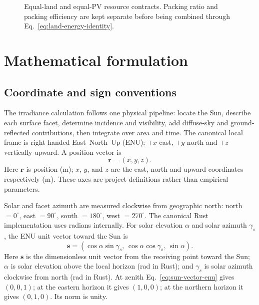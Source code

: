 \documentclass[11pt,a4paper]{article}
\begin{document}
\begin{figure}[htbp]\centering

\caption{Equal-land and equal-PV resource contracts. Packing ratio and packing efficiency are kept separate before being combined through Eq.~\eqref{eq:land-energy-identity}.}
\label{fig:fair-comparison-framework}\end{figure}

\section{Mathematical formulation}
\subsection{Coordinate and sign conventions}
The irradiance calculation follows one physical pipeline: locate the Sun, describe each surface facet, determine incidence and visibility, add diffuse-sky and ground-reflected contributions, then integrate over area and time.
The canonical local frame is right-handed East--North--Up (ENU): \(+x\) east, \(+y\) north and \(+z\) vertically upward. A position vector is
\begin{equation}
\mathbf r=(x,y,z).
\label{eq:position-enu}
\end{equation}
Here \(\mathbf r\) is position (\si{\metre}); \(x\), \(y\), and \(z\) are the east, north and upward coordinates respectively (\si{\metre}). These axes are project definitions rather than empirical parameters.

Solar and facet azimuth are measured clockwise from geographic north: north \(=0^\circ\), east \(=90^\circ\), south \(=180^\circ\), west \(=270^\circ\). The canonical Rust implementation uses radians internally. For solar elevation \(\alpha\) and solar azimuth \(\gamma_s\), the ENU unit vector toward the Sun is
\begin{equation}
\mathbf s=
\left(
\cos\alpha\sin\gamma_s,\,
\cos\alpha\cos\gamma_s,\,
\sin\alpha
\right).
\label{eq:sun-vector-enu}
\end{equation}
Here \(\mathbf s\) is the dimensionless unit vector from the receiving point toward the Sun; \(\alpha\) is solar elevation above the local horizon (rad in Rust); and \(\gamma_s\) is solar azimuth clockwise from north (rad in Rust). At zenith Eq.~\eqref{eq:sun-vector-enu} gives \((0,0,1)\); at the eastern horizon it gives \((1,0,0)\); at the northern horizon it gives \((0,1,0)\). Its norm is unity.
\end{document}
